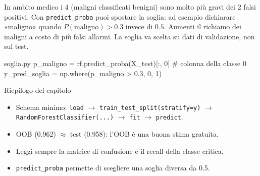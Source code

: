 \begin{attenzione}
In ambito medico i 4  (maligni classificati benigni) sono molto più gravi dei 2 falsi positivi. Con \texttt{predict\_proba} puoi spostare la soglia: ad esempio dichiarare «maligno» quando $P(\text{maligno})>0.3$ invece di $0.5$. Aumenti il richiamo dei maligni a costo di più falsi allarmi. La soglia va scelta su dati di validazione, non sul test.
\end{attenzione}

\begin{consiglio}
\begin{codice}{soglia.py}
p_maligno = rf.predict_proba(X_test)[:, 0]     # colonna della classe 0
y_pred_soglia = np.where(p_maligno > 0.3, 0, 1)
\end{codice}
\end{consiglio}

\begin{appunti}{Riepilogo del capitolo}
\begin{itemize}
  \item Schema minimo: \texttt{load} $\rightarrow$ \texttt{train\_test\_split(stratify=y)} $\rightarrow$ \texttt{RandomForestClassifier(...)} $\rightarrow$ \texttt{fit} $\rightarrow$ \texttt{predict}.
  \item OOB (0.962) $\approx$ test (0.958): l'OOB è una buona stima gratuita.
  \item Leggi sempre la matrice di confusione e il recall della classe critica.
  \item \texttt{predict\_proba} permette di scegliere una soglia diversa da 0.5.
\end{itemize}
\end{appunti}
